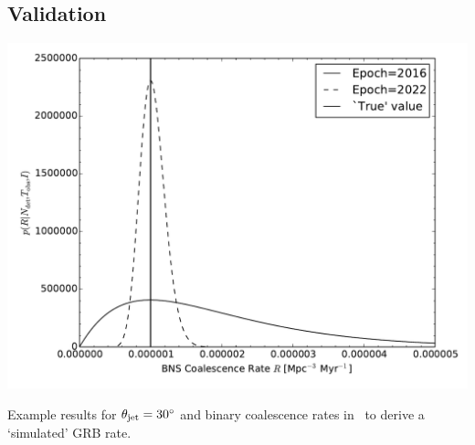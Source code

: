 \documentclass[a0,landscape]{a0poster}
\begin{document}
\begin{multicols}{4}

\subsection*{Validation}

\begin{center}\vspace{1cm}
    \includegraphics[width=0.5\linewidth]{aligo_rate_re.pdf}
\end{center}\vspace{1cm}

\begin{minipage}{\columnwidth}
  \makeatletter
  \newcommand{\@captype}{figure}
  \makeatother
  \centering
  \qquad%
  \caption{Example results for $\theta_{\rm jet}=30^{\circ}$ and binary
  coalescence rates in~\cite{scenarios} to derive a `simulated' GRB rate.}
\end{minipage}


\end{multicols}
\end{document}
